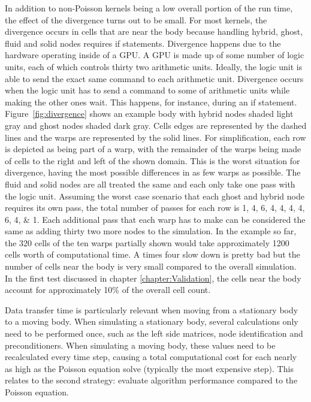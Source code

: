 In addition to non-Poisson kernels being a low overall portion of the run time, the effect of the divergence turns out to be small. 
For most kernels, the divergence occurs in cells that are near the body because handling hybrid, ghost, fluid and solid nodes requires if statements. 
Divergence happens due to the hardware operating inside of a GPU. 
A GPU is made up of some number of logic units, each of which controls thirty two arithmetic units. 
Ideally, the logic unit is able to send the exact same command to each arithmetic unit. 
Divergence occurs when the logic unit has to send a command to some of arithmetic units while making the other ones wait. 
This happens, for instance, during an if statement. 
Figure~\ref{fig:divergence} shows an example body with hybrid nodes shaded light gray and ghost nodes shaded dark gray. 
Cells edges are represented by the dashed lines and the warps are represented by the solid lines. 
For simplification, each row is depicted as being part of a warp, with the remainder of the warps being made of cells to the right and left of the shown domain. 
This is the worst situation for divergence, having the most possible differences in as few warps as possible. 
The fluid and solid nodes are all treated the same and each only take one pass with the logic unit. 
Assuming the worst case scenario that each ghost and hybrid node requires its own pass, the total number of passes for each row is \numlist{1;4;6;4;4;4;4;6;4;1}. 
Each additional pass that each warp has to make can be considered the same as adding thirty two more nodes to the simulation. 
In the example so far, the 320 cells of the ten warps partially shown would take approximately 1200 cells worth of computational time. 
A times four slow down is pretty bad but the number of cells near the body is very small compared to the overall simulation. 
In the first test discussed in chapter \ref{chapter:Validation}, the cells near the body account for approximately 10\% of the overall cell count.


Data transfer time is particularly relevant when moving from a stationary body to a moving body.
When simulating a stationary body, several calculations only need to be performed once, such as the left side matrices, node identification and preconditioners.
When simulating a moving body, these values need to be recalculated every time step, causing a total computational cost for each nearly as high as the Poisson equation solve (typically the most expensive step). 
This relates to the second strategy: evaluate algorithm performance compared to the Poisson equation. 

